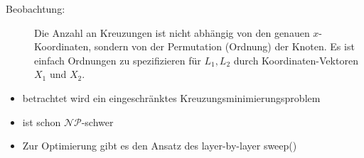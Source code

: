 \vspace*{-0.5\baselineskip}
\begin{description}
	\item[Beobachtung:] Die Anzahl an Kreuzungen ist nicht abhängig von den genauen $x$-Koordinaten, sondern von der Permutation (Ordnung) der Knoten. Es ist einfach Ordnungen zu spezifizieren für $L_1,L_2$ durch Koordinaten-Vektoren $X_1$ und $X_2$.
\end{description}
\begin{itemize}[itemsep=-1pt]
	\item betrachtet wird ein eingeschränktes Kreuzungsminimierungsproblem
	\item ist schon $\mathcal{NP}$-schwer
	\item Zur Optimierung gibt es den Ansatz des \glqq layer-by-layer sweep\grqq (\algobreak{})
\end{itemize}
